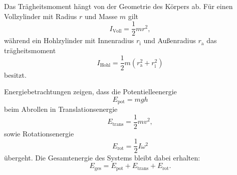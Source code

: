 Das Trägheitsmoment hängt von der Geometrie des Körpers ab. Für einen Vollzylinder mit Radius $r$ und Masse $m$ gilt
\begin{equation}
    I_\text{Voll} = \frac{1}{2} m r^2,
    \label{eq:traegheit_voll}
\end{equation}
während ein Hohlzylinder mit Innenradius $r_\text{i}$ und Außenradius $r_\text{a}$ das trägheitsmoment
\begin{equation}
    I_\text{Hohl} = \frac{1}{2} m \left(r_\text{a}^2 + r_\text{i}^2\right)
    \label{eq:traegheit_hohl}
\end{equation}
besitzt.  

Energiebetrachtungen zeigen, dass die Potentielleenergie
\begin{equation}
    E_\text{pot} = m g h
    \label{eq:epot}
\end{equation}
beim Abrollen in Translationsenergie
\begin{equation}
    E_\text{trans} = \frac{1}{2} m v^2,
    \label{eq:etrans}
\end{equation}
sowie Rotationsenergie
\begin{equation}
    E_\text{rot} = \frac{1}{2} I \omega^2
    \label{eq:erot}
\end{equation}
übergeht.  
Die Gesamtenergie des Systems bleibt dabei erhalten:
\begin{equation}
    E_\text{ges} = E_\text{pot} + E_\text{trans} + E_\text{rot}.
    \label{eq:eges}
\end{equation}
